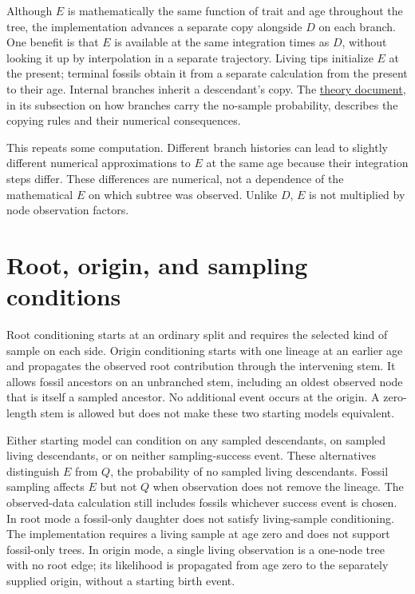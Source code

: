 \documentclass[11pt]{article}
\begin{document}
Although $E$ is mathematically the same function of trait and age throughout the tree, the
implementation advances a separate copy alongside $D$ on each branch. One benefit is that $E$
is available at the same integration times as $D$, without looking it up by interpolation in
a separate trajectory. Living tips initialize $E$ at the present; terminal fossils obtain it
from a separate calculation from the present to their age. Internal branches inherit a
descendant's copy. The \href{theory.pdf}{theory document}, in its subsection on how branches
carry the no-sample probability, describes the copying rules and their numerical consequences.

This repeats some computation. Different branch histories can lead to slightly different
numerical approximations to $E$ at the same age because their integration steps differ.
These differences are numerical, not a dependence of the mathematical $E$ on which subtree
was observed. Unlike $D$, $E$ is not multiplied by node observation factors.

\section{Root, origin, and sampling conditions}
Root conditioning starts at an ordinary split and requires the selected kind of sample on each
side. Origin conditioning starts with one lineage at an earlier age and propagates the observed
root contribution through the intervening stem. It allows fossil ancestors on an unbranched stem,
including an oldest observed node that is itself a sampled ancestor. No additional event occurs
at the origin. A zero-length stem is allowed but does not make these two starting models equivalent.

Either starting model can condition on any sampled descendants, on sampled living descendants,
or on neither sampling-success event. These alternatives distinguish $E$ from $Q$, the probability
of no sampled living descendants. Fossil sampling affects $E$ but not $Q$ when observation does not
remove the lineage. The observed-data calculation still includes fossils whichever success event
is chosen. In root mode a fossil-only daughter does not satisfy living-sample conditioning.
The implementation requires a living sample at age zero and does not support fossil-only trees.
In origin mode, a single living observation is a one-node tree with no root edge; its likelihood
is propagated from age zero to the separately supplied origin, without a starting birth event.
\end{document}
